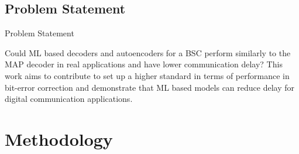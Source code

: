 \documentclass{beamer}
\begin{document}
\subsection{Problem Statement}
\begin{frame}{Problem Statement}

\begin{outline}
\1 Could ML based decoders and autoencoders for a BSC perform similarly to the MAP decoder in real applications and have lower communication delay?
\pause
\1 This work aims to contribute to set up a higher standard in terms of performance in bit-error correction and demonstrate that ML based models can reduce delay for digital communication applications. 
\end{outline}
  
\end{frame}




\section{Methodology}
\end{document}
